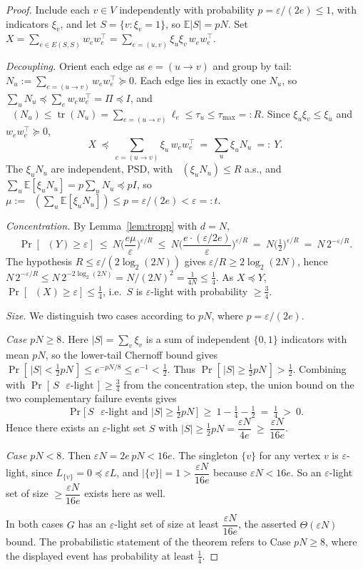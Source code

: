 \documentclass[12pt]{article}
\DeclareMathOperator{\tr}{tr}
\DeclareMathOperator*{\lammax}{\lambda_{\max}}
\newcommand{\eps}{\varepsilon}
\theoremstyle{definition}
\begin{document}
\begin{proof}
Include each $v\in V$ independently with probability $p=\eps/(2e)\le1$, with
indicators $\xi_v$, and let $S=\{v:\xi_v=1\}$, so $\mathbb E|S|=pN$. Set
$X=\sum_{e\in E(S,S)}w_ew_e^{\top}=\sum_{e=(u,v)}\xi_u\xi_v\,w_ew_e^{\top}$.

\emph{Decoupling.} Orient each edge as $e=(u\to v)$ and group by tail:
$N_u:=\sum_{e=(u\to v)}w_ew_e^{\top}\succeq0$. Each edge lies in exactly one
$N_u$, so $\sum_uN_u\preceq\sum_ew_ew_e^{\top}=\Pi\preceq I$, and
$\lammax(N_u)\le\tr(N_u)=\sum_{e=(u\to v)}\ell_e\le\tau_u\le\tau_{\max}=:R$.
Since $\xi_u\xi_v\le\xi_u$ and $w_ew_e^{\top}\succeq0$,
\[
  X\ \preceq\ \sum_{e=(u\to v)}\xi_u\,w_ew_e^{\top}\ =\ \sum_u\xi_uN_u\ =:\ Y .
\]
The $\xi_uN_u$ are independent, PSD, with $\lammax(\xi_uN_u)\le R$ a.s., and
$\sum_u\mathbb E[\xi_uN_u]=p\sum_uN_u\preceq pI$, so $\mu:=\lammax(\sum_u\mathbb
E[\xi_uN_u])\le p=\eps/(2e)<\eps=:t$.

\emph{Concentration.} By Lemma~\ref{lem:tropp} with $d=N$,
\[
  \Pr[\lammax(Y)\ge\eps]
  \ \le\ N\Big(\frac{e\mu}{\eps}\Big)^{\eps/R}
  \ \le\ N\Big(\frac{e\cdot(\eps/2e)}{\eps}\Big)^{\eps/R}
  \ =\ N\Big(\tfrac12\Big)^{\eps/R}
  \ =\ N\,2^{-\eps/R}.
\]
The hypothesis $R\le\eps/(2\log_2(2N))$ gives $\eps/R\ge2\log_2(2N)$, hence
$N\,2^{-\eps/R}\le N\,2^{-2\log_2(2N)}=N/(2N)^2=\tfrac{1}{4N}\le\tfrac14$. As
$X\preceq Y$, $\Pr[\lammax(X)\ge\eps]\le\tfrac14$, i.e.\ $S$ is $\eps$-light with
probability $\ge\tfrac34$.

\emph{Size.} We distinguish two cases according to $pN$, where $p=\eps/(2e)$.

\emph{Case $pN\ge8$.} Here $|S|=\sum_v\xi_v$ is a sum of independent $\{0,1\}$
indicators with mean $pN$, so the lower-tail Chernoff bound gives
$\Pr[\,|S|<\tfrac12pN\,]\le e^{-pN/8}\le e^{-1}<\tfrac12$. Thus
$\Pr[\,|S|\ge\tfrac12pN\,]>\tfrac12$. Combining with
$\Pr[\,S\text{ $\eps$-light}\,]\ge\tfrac34$ from the concentration step, the
union bound on the two complementary failure events gives
\[
  \Pr\big[\,S\text{ $\eps$-light and }|S|\ge\tfrac12pN\,\big]
  \ \ge\ 1-\tfrac14-\tfrac12\ =\ \tfrac14\ >\ 0 .
\]
Hence there exists an $\eps$-light set $S$ with
$|S|\ge\tfrac12pN=\dfrac{\eps N}{4e}\ \ge\ \dfrac{\eps N}{16e}$.

\emph{Case $pN<8$.} Then $\eps N=2e\,pN<16e$. The singleton $\{v\}$ for any
vertex $v$ is $\eps$-light, since $L_{\{v\}}=0\preceq\eps L$, and
$|\{v\}|=1>\dfrac{\eps N}{16e}$ because $\eps N<16e$. So an $\eps$-light set of
size $\ge\dfrac{\eps N}{16e}$ exists here as well.

In both cases $G$ has an $\eps$-light set of size at least $\dfrac{\eps N}{16e}$,
the asserted $\Theta(\eps N)$ bound. The probabilistic statement of the theorem
refers to Case $pN\ge8$, where the displayed event has probability at least
$\tfrac14$.
\end{proof}
\end{document}
